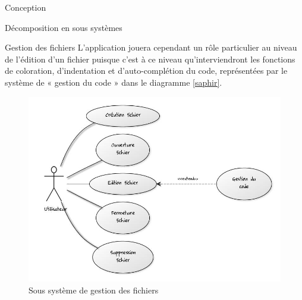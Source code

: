\documentclass[a4paper, 12pt]{report}
\begin{document}
\begin{part}{Conception}
\begin{chapter}{Décomposition en sous systèmes}
\begin{section}{Gestion des fichiers}
				L'application jouera cependant un rôle particulier au niveau de l'édition d'un fichier puisque c'est à ce niveau qu'interviendront
				les fonctions de coloration, d'indentation et d'auto-complétion du code, représentées par le système de « gestion du code » dans le 
				diagramme \ref{saphir}. \\
				\begin{figure}[ht]
					\begin{center}
						\includegraphics[width=13cm]{images/gestionFichiers.jpg}
						\caption{Sous système de gestion des fichiers}
						\label{carabine}
					\end{center}
				\end{figure}~\\
			\end{section}


\end{chapter}
\end{part}
\end{document}

